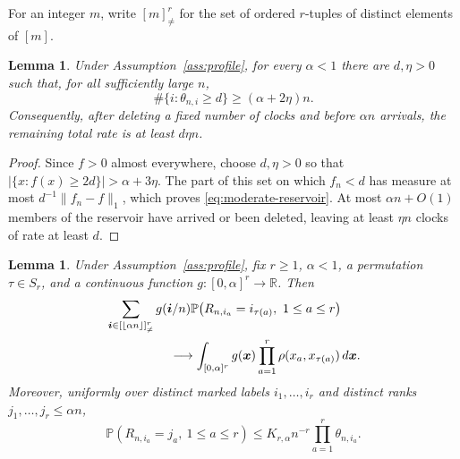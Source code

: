 \documentclass[11pt]{article}
\newtheorem{lemma}[theorem]{Lemma}
\theoremstyle{remark}
\theoremstyle{plain}
\newcommand{\Pp}{\mathbb P}
\newcommand{\R}{\mathbb R}
\begin{document}
For an integer $m$, write $[m]^r_{\ne}$ for the set of ordered $r$-tuples of
distinct elements of $[m]$.

\begin{lemma}\label{lem:moderate-reservoir}
Under Assumption~\ref{ass:profile}, for every $\alpha<1$ there are
$d,\eta>0$ such that, for all sufficiently large $n$,
\begin{equation}\label{eq:moderate-reservoir}
 \#\{i:\theta_{n,i}\ge d\}\ge(\alpha+2\eta)n.
\end{equation}
Consequently, after deleting a fixed number of clocks and before $\alpha n$
arrivals, the remaining total rate is at least $d\eta n$.
\end{lemma}

\begin{proof}
Since $f>0$ almost everywhere, choose $d,\eta>0$ so that
$|\{x:f(x)\ge2d\}|>\alpha+3\eta$.  The part of this set on which $f_n<d$ has
measure at most $d^{-1}\lVert f_n-f\rVert_1$, which proves
\eqref{eq:moderate-reservoir}.  At most $\alpha n+O(1)$ members of the
reservoir have arrived or been deleted, leaving at least $\eta n$ clocks of
rate at least $d$.
\end{proof}

\begin{lemma}\label{lem:cyclic-local}
Under Assumption~\ref{ass:profile}, fix $r\ge1$, $\alpha<1$, a permutation
$\tau\in S_r$, and a continuous function $g:[0,\alpha]^r\to\R$.  Then
\begin{align}
 &\sum_{\boldsymbol i\in[\lfloor\alpha n\rfloor]^r_{\ne}}
 g(\boldsymbol i/n)
 \Pp\bigl(R_{n,i_a}=i_{\tau(a)},\ 1\le a\le r\bigr)
 \label{eq:cyclic-local-limit}\\
 &\hspace{0.7in}\longrightarrow
 \int_{[0,\alpha]^r}g(\boldsymbol x)
 \prod_{a=1}^r\rho(x_a,x_{\tau(a)})\,d\boldsymbol x.
 \notag
\end{align}
Moreover, uniformly over distinct marked labels $i_1,\ldots,i_r$ and
distinct ranks $j_1,\ldots,j_r\le\alpha n$,
\begin{equation}\label{eq:weighted-bulk-cylinder}
 \Pp(R_{n,i_a}=j_a,\ 1\le a\le r)
 \le K_{r,\alpha}n^{-r}\prod_{a=1}^r\theta_{n,i_a}.
\end{equation}
\end{lemma}
\end{document}
